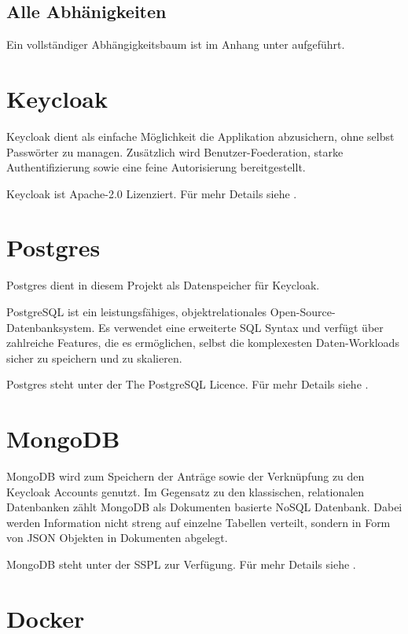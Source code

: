 \subsection{Alle Abhänigkeiten}
Ein vollständiger Abhängigkeitsbaum ist im Anhang unter  aufgeführt.

\section{Keycloak}\label{sec:keycloak}

Keycloak dient als einfache Möglichkeit die Applikation abzusichern, ohne selbst Passwörter zu managen.
Zusätzlich wird \gls{Benutzer-Foederation}, starke Authentifizierung sowie eine feine Autorisierung bereitgestellt.
\cite{about-keycloak}

Keycloak ist Apache-2.0 Lizenziert.
Für mehr Details siehe .

\section{Postgres}\label{sec:postgres}

Postgres dient in diesem Projekt als Datenspeicher für Keycloak.

PostgreSQL ist ein leistungsfähiges, objektrelationales Open-Source-Datenbanksystem.
Es verwendet eine erweiterte \ac{SQL} Syntax und verfügt über zahlreiche Features,
die es ermöglichen, selbst die komplexesten Daten-Workloads sicher zu speichern und zu skalieren.
\cite{about-postgres}

Postgres steht unter der The PostgreSQL Licence.
Für mehr Details siehe .


\section{MongoDB}\label{sec:mongodb}

MongoDB wird zum Speichern der Anträge sowie der Verknüpfung zu den Keycloak Accounts genutzt.
Im Gegensatz zu den klassischen, relationalen Datenbanken zählt MongoDB als Dokumenten basierte NoSQL Datenbank.
Dabei werden Information nicht streng auf einzelne Tabellen verteilt, sondern in Form von \ac{JSON} Objekten in Dokumenten abgelegt.

MongoDB steht unter der \acl{SSPL} zur Verfügung.
Für mehr Details siehe .

\section{Docker}\label{sec:docker}


